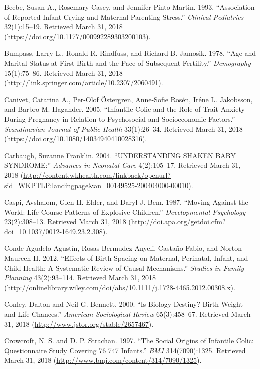 \documentclass[]{article}
\begin{document}
\hypertarget{ref-beebe_association_1993}{}
Beebe, Susan A., Rosemary Casey, and Jennifer Pinto-Martin. 1993.
``Association of Reported Infant Crying and Maternal Parenting Stress.''
\emph{Clinical Pediatrics} 32(1):15--19. Retrieved March 31, 2018
(\url{https://doi.org/10.1177/000992289303200103}).

\hypertarget{ref-bumpass_age_1978}{}
Bumpass, Larry L., Ronald R. Rindfuss, and Richard B. Jamosik. 1978.
``Age and Marital Status at First Birth and the Pace of Subsequent
Fertility.'' \emph{Demography} 15(1):75--86. Retrieved March 31, 2018
(\url{http://link.springer.com/article/10.2307/2060491}).

\hypertarget{ref-canivet_infantile_2005}{}
Canivet, Catarina A., Per-Olof Östergren, Anne-Sofie Rosén, Iréne L.
Jakobsson, and Barbro M. Hagander. 2005. ``Infantile Colic and the Role
of Trait Anxiety During Pregnancy in Relation to Psychosocial and
Socioeconomic Factors.'' \emph{Scandinavian Journal of Public Health}
33(1):26--34. Retrieved March 31, 2018
(\url{https://doi.org/10.1080/14034940410028316}).

\hypertarget{ref-carbaugh_understanding_2004}{}
Carbaugh, Suzanne Franklin. 2004. ``UNDERSTANDING SHAKEN BABY
SYNDROME:'' \emph{Advances in Neonatal Care} 4(2):105--17. Retrieved
March 31, 2018
(\url{http://content.wkhealth.com/linkback/openurl?sid=WKPTLP:landingpage\&an=00149525-200404000-00010}).

\hypertarget{ref-caspi_moving_1987}{}
Caspi, Avshalom, Glen H. Elder, and Daryl J. Bem. 1987. ``Moving Against
the World: Life-Course Patterns of Explosive Children.''
\emph{Developmental Psychology} 23(2):308--13. Retrieved March 31, 2018
(\url{http://doi.apa.org/getdoi.cfm?doi=10.1037/0012-1649.23.2.308}).

\hypertarget{ref-condeagudelo_agustin_effects_2012}{}
Conde‐Agudelo Agustín, Rosas‐Bermudez Anyeli, Castaño Fabio, and Norton
Maureen H. 2012. ``Effects of Birth Spacing on Maternal, Perinatal,
Infant, and Child Health: A Systematic Review of Causal Mechanisms.''
\emph{Studies in Family Planning} 43(2):93--114. Retrieved March 31,
2018
(\url{http://onlinelibrary.wiley.com/doi/abs/10.1111/j.1728-4465.2012.00308.x}).

\hypertarget{ref-conley_is_2000}{}
Conley, Dalton and Neil G. Bennett. 2000. ``Is Biology Destiny? Birth
Weight and Life Chances.'' \emph{American Sociological Review}
65(3):458--67. Retrieved March 31, 2018
(\url{http://www.jstor.org/stable/2657467}).

\hypertarget{ref-crowcroft_social_1997}{}
Crowcroft, N. S. and D. P. Strachan. 1997. ``The Social Origins of
Infantile Colic: Questionnaire Study Covering 76 747 Infants.''
\emph{BMJ} 314(7090):1325. Retrieved March 31, 2018
(\url{http://www.bmj.com/content/314/7090/1325}).
\end{document}
